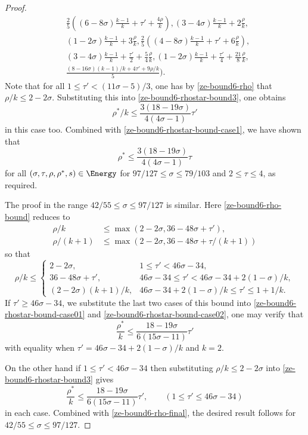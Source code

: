 \begin{proof}
\begin{equation}
\begin{split}
&\frac{2}{5}((6 - 8\sigma)\frac{k - 1}{k} + \tau' + \frac{4\rho}{k}), (3 - 4\sigma)\frac{k - 1}{k} + 2\frac{\rho}{k}, \\
&(1 - 2\sigma)\frac{k - 1}{k} + 3\frac{\rho}{k}, \frac{2}{5}((4 - 8\sigma)\frac{k - 1}{k} + \tau' + 6\frac{\rho}{k}),\\
&(3 - 4\sigma)\frac{k - 1}{k} + \frac{\tau'}{2} + \frac{5}{4}\frac{\rho}{k}, (1 - 2\sigma)\frac{k - 1}{k} + \frac{\tau'}{4} + \frac{21}{8}\frac{\rho}{k}, \\
&\frac{(8 - 16\sigma)(k - 1)/k + 4\tau' + 9\rho/k}{5}\bigg).
\end{split}
\end{equation}
Note that for all $1 \le \tau' < (11\sigma - 5)/3$, one has by \eqref{ze-bound6-rho} that $\rho/k \le 2 - 2\sigma$. Substituting this into \eqref{ze-bound6-rhostar-bound3}, one obtains
\[
\rho^*/k \le \frac{3(18-19\sigma)}{4(4\sigma-1)}\tau'
\]
in this case too. Combined with \eqref{ze-bound6-rhostar-bound-case1}, we have shown that
\[
\rho^* \le \frac{3(18-19\sigma)}{4(4\sigma-1)}\tau
\]
for all $(\sigma, \tau, \rho, \rho^*, s) \in \Energy$ for $97/127 \le \sigma\le 79/103$ and $2 \le \tau \le 4$, as required.

The proof in the range $42/55 \le \sigma \le 97/127$ is similar. Here \eqref{ze-bound6-rho-bound} reduces to
\begin{align*}
\rho/k &\le \max(2 - 2\sigma, 36 - 48\sigma + \tau'),\\
\rho/(k + 1) &\le \max(2 - 2\sigma, 36 - 48\sigma + \tau/(k + 1))
\end{align*}
so that
\begin{equation}\label{ze-bound6-rho-case2}
\rho/k \le \begin{cases}
2 - 2\sigma,&1 \le \tau' < 46\sigma - 34,\\
36 - 48\sigma + \tau',& 46\sigma - 34 \le \tau' < 46\sigma - 34 + 2(1 - \sigma)/k,\\
(2 - 2\sigma)(k + 1)/k,& 46\sigma - 34 + 2(1 - \sigma)/k \le \tau' \le 1 + 1/k.
\end{cases}
\end{equation}
If $\tau' \ge 46\sigma - 34$, we substitute the last two cases of this bound into \eqref{ze-bound6-rhostar-bound-case01} and \eqref{ze-bound6-rhostar-bound-case02}, one may verify that
\begin{equation}\label{ze-bound6-rho-final}
\frac{\rho^*}{k} \le \frac{18 - 19\sigma}{6(15\sigma - 11)}\tau'
\end{equation}
with equality when $\tau' = 46\sigma - 34 + 2(1 - \sigma)/k$ and $k = 2$.

On the other hand if $1 \le \tau' < 46\sigma - 34$ then substituting $\rho/k \le 2 - 2\sigma$ into \eqref{ze-bound6-rhostar-bound3} gives
\[
\frac{\rho^*}{k} \le \frac{18 - 19\sigma}{6(15\sigma - 11)}\tau',\qquad (1 \le \tau' \le 46\sigma - 34)
\]
in each case. Combined with \eqref{ze-bound6-rho-final}, the desired result follows for $42/55 \le \sigma \le 97/127$.
\end{proof}

